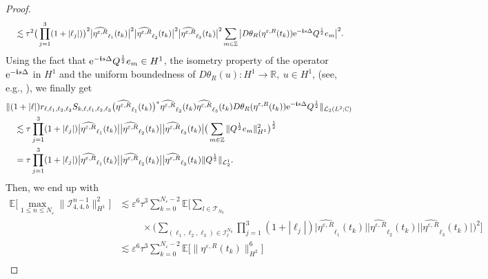 \documentclass[a4paper]{amsart}
\begin{document}
\begin{proof}
\begin{align*}
        &\quad\lesssim \tau^2 \big(\prod_{j=1}^{3} (1+|\ell_j|)\big)^2 \big|\widehat{\eta^{\varepsilon,R}}_{\ell_1}(t_k)\big|^2 \big|\widehat{\eta^{\varepsilon,R}}_{\ell_2}(t_k)\big|^2 \big|\widehat{\eta^{\varepsilon,R}}_{\ell_3}(t_k)\big|^2 
        \sum_{m\in\mathbb{Z}} \big|D\theta_R(\eta^{\varepsilon,R}(t_k)){{\rm e}}^{-{\bf i}s\Delta}Q^{\frac{1}{2}}e_m\big|^2.
   \end{align*}
   Using the fact that ${\rm e}^{-{\bf i}s \Delta}Q^{\frac{1}{2}}e_m \in H^1$, the isometry property of the operator ${\rm e}^{-{\bf i}s\Delta}$ in $H^1$ and the uniform boundedness of $D\theta_R(u) :H^1\to \mathbb{R}, \ u\in H^1$, (see, e.g., \cite{deb0}), we finally get
   \begin{align*}
       &\| (1+|\ell|) r_{\ell,\ell_1,\ell_2,\ell_3}S_{k,\ell,\ell_1,\ell_2,\ell_3}
        \big(\widehat{\eta^{\varepsilon,R}}_{\ell_1}(t_k)\big)^*\widehat{\eta^{\varepsilon,R}}_{\ell_2}(t_k)\widehat{\eta^{\varepsilon,R}}_{\ell_3}(t_k) D\theta_R(\eta^{\varepsilon,R}(t_k)){{\rm e}}^{-{\bf i}s\Delta}Q^{\frac{1}{2}}\|_{\mathcal{L}_2(L^2;\mathbb{C})}\\
        &\quad \lesssim \tau \prod_{j=1}^{3} (1+|\ell_j|) \big|\widehat{\eta^{\varepsilon,R}}_{\ell_1}(t_k)\big| \big|\widehat{\eta^{\varepsilon,R}}_{\ell_2}(t_k)\big| \big|\widehat{\eta^{\varepsilon,R}}_{\ell_3}(t_k)\big| \big(\sum_{m\in\mathbb{Z}} \|Q^{\frac{1}{2}}e_m\|^2_{H^1}\big)^{\frac{1}{2}}\\
        &\quad = \tau \prod_{j=1}^{3} (1+|\ell_j|) \big|\widehat{\eta^{\varepsilon,R}}_{\ell_1}(t_k)\big| \big|\widehat{\eta^{\varepsilon,R}}_{\ell_2}(t_k)\big| \big|\widehat{\eta^{\varepsilon,R}}_{\ell_3}(t_k) \|Q^{\frac{1}{2}}\|_{\mathcal{L}_2^1}.
   \end{align*}
   Then, we end up with
   \begin{align*}
        \mathbb{E}\big[\max_{1\le n\le N_\varepsilon}\|\mathcal{I}^{n-1}_{4,4,b}\|^2_{H^1}\big]&\lesssim\varepsilon^6 \tau^3 \sum_{k=0}^{N_\varepsilon-2}\mathbb{E}\big[\sum_{l\in\mathcal{T}_{N_0}}\\
        &\hspace{1cm}\times \big(\sum_{(\ell_1,\ell_2,\ell_3)\in\mathcal{I}_{\ell}^{N_0}} \prod_{j=1}^{3} (1+|\ell_j|)\big|\widehat{\eta^{\varepsilon,R}}_{\ell_1}(t_k)\big| \big|\widehat{\eta^{\varepsilon,R}}_{\ell_2}(t_k)\big| \big|\widehat{\eta^{\varepsilon,R}}_{\ell_3}(t_k)\big| \big)^2\big]\\
        &\lesssim \varepsilon^6 \tau^3 \sum_{k=0}^{N_\varepsilon-2}\mathbb{E}\big[\|\eta^{\varepsilon,R}(t_k)\|^6_{H^2}\big]\\

\end{align*}
\end{proof}
\end{document}
